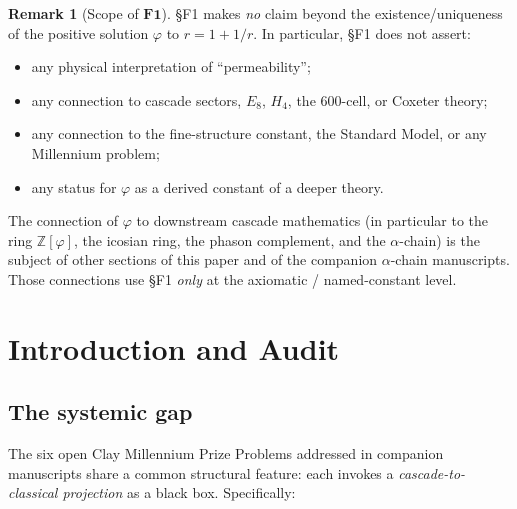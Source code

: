 \documentclass[11pt, a4paper]{amsart}
\theoremstyle{definition}
\newtheorem{remark}[theorem]{Remark}
\newcommand{\Z}{\mathbb{Z}}
\begin{document}
\begin{remark}[Scope of $\mathbf{F1}$]
\label{rmk:F1-scope}
\S F1 makes \emph{no} claim beyond the existence/uniqueness
of the positive solution $\varphi$ to $r = 1 + 1/r$. In
particular, \S F1 does not assert:
\begin{itemize}
\item any physical interpretation of ``permeability'';
\item any connection to cascade sectors, $E_8$, $H_4$, the
  $600$-cell, or Coxeter theory;
\item any connection to the fine-structure constant, the
  Standard Model, or any Millennium problem;
\item any status for $\varphi$ as a derived constant of a
  deeper theory.
\end{itemize}
The connection of $\varphi$ to downstream cascade mathematics
(in particular to the ring $\Z[\varphi]$, the icosian ring,
the phason complement, and the $\alpha$-chain) is the
subject of other sections of this paper and of the
companion $\alpha$-chain manuscripts. Those connections use
\S F1 \emph{only} at the axiomatic / named-constant level.
\end{remark}

\section{Introduction and Audit}
\label{sec:intro}

\subsection{The systemic gap}
\label{subsec:gap}

The six open Clay Millennium Prize Problems addressed in companion
manuscripts \cite{MillenniumYM, MillenniumRH, MillenniumNS,
MillenniumHodge, MillenniumBSD, MillenniumPNP} share a common
structural feature: each invokes a \emph{cascade-to-classical
projection} as a black box. Specifically:
\end{document}
